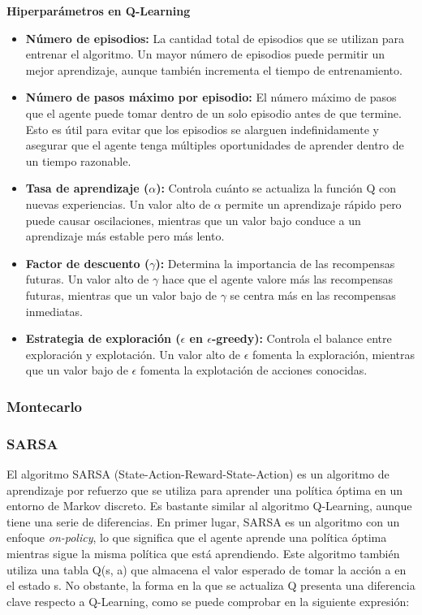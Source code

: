 \documentclass[conference,a4paper]{IEEEtran}
\begin{document}
\textbf{Hiperparámetros en Q-Learning}
\begin{itemize}
  \item \textbf{Número de episodios:} La cantidad total de episodios que se utilizan para entrenar el algoritmo. Un mayor número de episodios puede permitir un mejor aprendizaje, aunque también incrementa el tiempo de entrenamiento.
  \item \textbf{Número de pasos máximo por episodio:} El número máximo de pasos que el agente puede tomar dentro de un solo episodio antes de que termine. Esto es útil para evitar que los episodios se alarguen indefinidamente y asegurar que el agente tenga múltiples oportunidades de aprender dentro de un tiempo razonable.
  \item \textbf{Tasa de aprendizaje (\(\alpha\)):} Controla cuánto se actualiza la función Q con nuevas experiencias. Un valor alto de \(\alpha\) permite un aprendizaje rápido pero puede causar oscilaciones, mientras que un valor bajo conduce a un aprendizaje más estable pero más lento.
  \item \textbf{Factor de descuento (\(\gamma\)):} Determina la importancia de las recompensas futuras. Un valor alto de \(\gamma\) hace que el agente valore más las recompensas futuras, mientras que un valor bajo de \(\gamma\) se centra más en las recompensas inmediatas.
  \item \textbf{Estrategia de exploración (\(\epsilon\) en \(\epsilon\)-greedy):} Controla el balance entre exploración y explotación. Un valor alto de \(\epsilon\) fomenta la exploración, mientras que un valor bajo de \(\epsilon\) fomenta la explotación de acciones conocidas.\newline
\end{itemize}


\subsubsection{\textbf{Montecarlo}}

\subsubsection{\textbf{SARSA}}
El algoritmo SARSA (State-Action-Reward-State-Action) es un algoritmo de aprendizaje por refuerzo que se utiliza para aprender una política óptima en un entorno de Markov discreto. Es bastante similar al algoritmo Q-Learning, 
aunque tiene una serie de diferencias. En primer lugar, SARSA es un algoritmo con un enfoque \textit{on-policy}, lo que significa 
que el agente aprende una política óptima mientras sigue la misma política que está aprendiendo. Este algoritmo también utiliza una tabla Q(s, a) que almacena el valor esperado de tomar la acción a en el estado s. No obstante, 
la forma en la que se actualiza Q presenta una diferencia clave respecto a Q-Learning, como se puede comprobar en la siguiente expresión:
\end{document}
